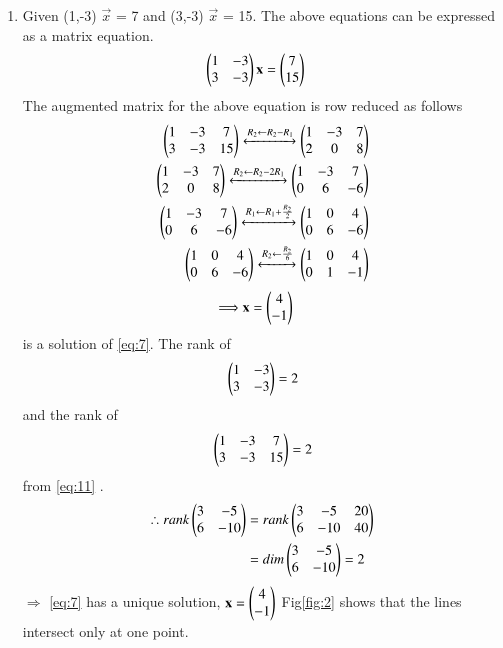 \documentclass[journal,12pt,twocolumn]{IEEEtran}
\begin{document}
\begin{enumerate}
    \item Given (1,-3) $\vec{x}$ = 7 and (3,-3) $\vec{x}$ = 15.
    The above equations can be expressed as a matrix equation.
    \begin{align}
\label{eq:7}
  \begin{pmatrix}1&-3\\3&-3\end{pmatrix}\mathbf{x} &= \begin{pmatrix}7\\15\end{pmatrix}
\end{align}
The augmented matrix for the above equation
is row reduced as follows
\begin{align}
    \begin{pmatrix}1&-3&7\\3&-3&15\end{pmatrix}\xleftrightarrow{R_2\leftarrow R_2 -R_1}\begin{pmatrix}1&-3&7\\2&0&8\end{pmatrix} 
    \\ 
    \begin{pmatrix}1&-3&7\\2&0&8\end{pmatrix}\xleftrightarrow{R_2\leftarrow R_2 -2R_1}\begin{pmatrix}1&-3&7\\0&6&-6\end{pmatrix} 
    \\
    \begin{pmatrix}1&-3&7\\0&6&-6\end{pmatrix}\xleftrightarrow{R_1\leftarrow R_1 +\frac{R_2}{2}}\begin{pmatrix}1&0&4\\0&6&-6\end{pmatrix} 
\\ \begin{pmatrix}1&0&4\\0&6&-6\end{pmatrix}\xleftrightarrow{R_2\leftarrow\frac{R_2}{6}}\begin{pmatrix}1&0&4\\0&1&-1\end{pmatrix} \label{eq:11}\end{align} 
\begin{align}
 \Longrightarrow \mathbf{x}&=\begin{pmatrix}4\\-1\end{pmatrix}
\end{align} is a solution of \ref{eq:7}.
The rank of
\begin{equation} 
\begin{pmatrix}1&-3\\3&-3\end{pmatrix} = 2
\end{equation}
and the rank of
\begin{equation} 
\begin{pmatrix}1&-3&7\\3&-3&15\end{pmatrix} = 2
\end{equation}from \ref{eq:11} .
\begin{align}
    \therefore rank \begin{pmatrix}3&-5\\6&-10\end{pmatrix} &= rank\begin{pmatrix}3&-5&20\\6&-10&40\end{pmatrix}\\
    &=dim\begin{pmatrix}3&-5\\6&-10\end{pmatrix}=2
\end{align}
$\Longrightarrow$ \ref{eq:7} has a unique solution, $\mathbf{x}=\begin{pmatrix}4\\-1\end{pmatrix}$
Fig\ref{fig:2} shows that the lines intersect only at one point.


\end{enumerate}
\end{document}
